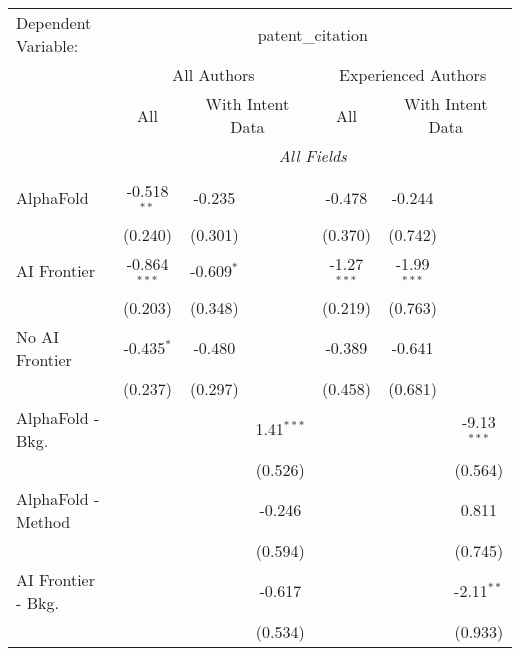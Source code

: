 \begingroup
\centering
\begin{tabular}{lcccccc}
   \tabularnewline \midrule \midrule
   Dependent Variable: & \multicolumn{6}{c}{patent\_citation}\\
 & \multicolumn{3}{c}{All Authors} & \multicolumn{3}{c}{Experienced Authors} \\
\cmidrule(lr){2-4} \cmidrule(lr){5-7}
 & \multicolumn{1}{c}{All} & \multicolumn{2}{c}{With Intent Data} & \multicolumn{1}{c}{All} & \multicolumn{2}{c}{With Intent Data} \\
\cmidrule(lr){2-2} \cmidrule(lr){3-4} \cmidrule(lr){5-5} \cmidrule(lr){6-7}
 & \multicolumn{6}{c}{\textit{All Fields}} \\ \\
   AlphaFold               & -0.518$^{**}$  & -0.235       &                & -0.478        & -0.244        &   \\   
                           & (0.240)        & (0.301)      &                & (0.370)       & (0.742)       &   \\   
   AI Frontier             & -0.864$^{***}$ & -0.609$^{*}$ &                & -1.27$^{***}$ & -1.99$^{***}$ &   \\   
                           & (0.203)        & (0.348)      &                & (0.219)       & (0.763)       &   \\   
   No AI Frontier          & -0.435$^{*}$   & -0.480       &                & -0.389        & -0.641        &   \\   
                           & (0.237)        & (0.297)      &                & (0.458)       & (0.681)       &   \\   
   AlphaFold - Bkg.        &                &              & 1.41$^{***}$   &               &               & -9.13$^{***}$\\   
                           &                &              & (0.526)        &               &               & (0.564)\\   
   AlphaFold - Method      &                &              & -0.246         &               &               & 0.811\\   
                           &                &              & (0.594)        &               &               & (0.745)\\   
   AI Frontier - Bkg.      &                &              & -0.617         &               &               & -2.11$^{**}$\\   
                           &                &              & (0.534)        &               &               & (0.933)\\   

\end{tabular}
